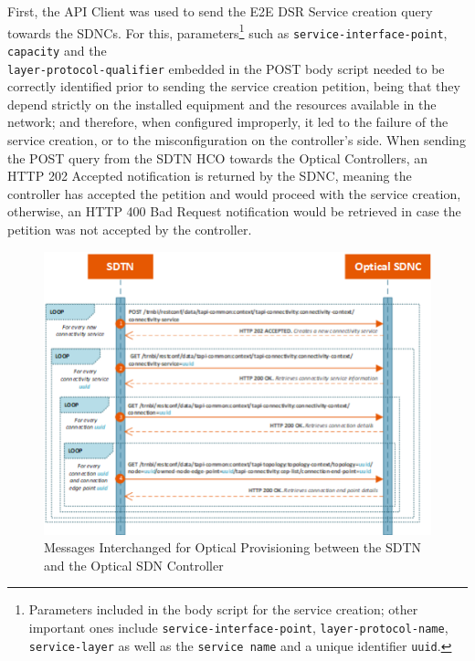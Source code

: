 \documentclass[a4paper,fleqn]{cas-dc}
\begin{document}
First, the API Client was used to send the E2E DSR Service creation query towards the SDNCs. For this, parameters\footnote{Parameters included in the body script for the service creation; other important ones include \texttt{service-interface-point}, \texttt{layer-protocol-name}, \texttt{service-layer} as well as the \texttt{service name} and a unique identifier \texttt{uuid}.} such as \texttt{service-interface-point}, \texttt{capacity} and the \\ \texttt{layer-protocol-qualifier} embedded in the POST body script needed to be correctly identified prior to sending the service creation petition, being that they depend strictly on the installed equipment and the resources available in the network; and therefore, when configured improperly, it led to the failure of the service creation, or to the misconfiguration on the controller’s side. When sending the POST query from the SDTN HCO towards the Optical Controllers, an HTTP 202 Accepted notification is returned by the SDNC, meaning the controller has accepted the petition and would proceed with the service creation, otherwise, an HTTP 400 Bad Request notification would be retrieved in case the petition was not accepted by the controller. 

\begin{figure}
	\centering
		\includegraphics[width=\linewidth]{figs/optical_provisioning_workflow_2.png}
	\caption{Messages Interchanged for Optical Provisioning between the SDTN and the Optical SDN Controller}
	\label{FIG:optical_provisioning_workflow}
\end{figure}
\end{document}
